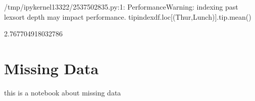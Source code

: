 \documentclass[letterpaper,10pt,english]{jupyterBook}
\begin{document}
\begin{sphinxVerbatim}[commandchars=\\\{\}]
  \PYG{p}{[}\PYG{p}{]}
\end{sphinxVerbatim}

\begin{sphinxVerbatim}[commandchars=\\\{\}]
\PYG{p}{[}\PYG{p}{]}
\end{sphinxVerbatim}

\begin{sphinxVerbatim}[commandchars=\\\{\}]
/tmp/ipykernel\PYGZus{}13322/2537502835.py:1: PerformanceWarning: indexing past lexsort depth may impact performance.
  tip\PYGZus{}index\PYGZus{}df.loc[(\PYGZsq{}Thur\PYGZsq{},\PYGZsq{}Lunch\PYGZsq{})].tip.mean()
\end{sphinxVerbatim}

\begin{sphinxVerbatim}[commandchars=\\\{\}]
2.767704918032786
\end{sphinxVerbatim}


\chapter{Missing Data}
\label{\detokenize{c2_data_preparation/missing_data:missing-data}}\label{\detokenize{c2_data_preparation/missing_data::doc}}
\sphinxAtStartPar
this is a notebook about missing data

\begin{sphinxVerbatim}[commandchars=\\\{\}]
  
\end{sphinxVerbatim}

\begin{sphinxVerbatim}[commandchars=\\\{\}]
   
\end{sphinxVerbatim}
\end{document}
